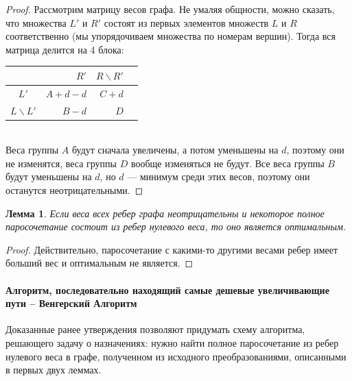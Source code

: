 \documentclass[a4paper,12pt]{article}
\newtheorem*{fulllemma}{Лемма}
\begin{document}
\begin{proof}
Рассмотрим матрицу весов графа. Не умаляя общности, можно сказать, что множества $L'$ и $R'$ состоят из первых элементов множеств $L$ и $R$ соответственно (мы упорядочиваем множества по номерам вершин). Тогда вся матрица делится на 4 блока:
\ \\

\begin{tabular}{c||*{3}{r|}|}
& $R'$ & $R \backslash R'$\\
\hline
\hline
$L'$ & $A + d - d$ & $C + d$\\
$L \backslash L'$ & $B - d$ & $D$\\
\hline
\end{tabular}\\

Веса группы $A$ будут сначала увеличены, а потом уменьшены на $d$, поэтому они не изменятся, веса группы $D$ вообще изменяться не будут. Все веса группы $B$ будут уменьшены на $d$, но $d$ — минимум среди этих весов, поэтому они останутся неотрицательными.
\end{proof}
\begin{fulllemma}
Если веса всех ребер графа неотрицательны и некоторое полное паросочетание состоит из ребер нулевого веса, то оно является оптимальным.
\end{fulllemma}
\begin{proof}
Действительно, паросочетание с какими-то другими весами ребер имеет больший вес и оптимальным не является.
\end{proof}

\paragraph{Алгоритм, последовательно находящий самые дешевые увеличивающие пути -- Венгерский Алгоритм}

Доказанные ранее утверждения позволяют придумать схему алгоритма, решающего задачу о назначениях: нужно найти полное паросочетание из ребер нулевого веса в графе, полученном из исходного преобразованиями, описанными в первых двух леммах.
\end{document}
